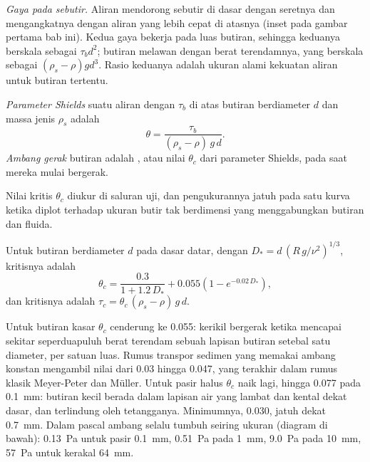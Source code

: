 \emph{Gaya pada sebutir.} Aliran mendorong sebutir di dasar dengan seretnya dan mengangkatnya dengan aliran yang lebih cepat di atasnya (inset pada gambar pertama bab
ini). Kedua gaya bekerja pada luas butiran, sehingga keduanya berskala sebagai $\tau_b
d^2$; butiran melawan dengan berat terendamnya, yang berskala sebagai
$(\rho_s - \rho) g d^3$. Rasio keduanya adalah ukuran alami kekuatan aliran untuk butiran tertentu.

\begin{definition}\label{def:b1:erosion-transport:threshold}
\emph{Parameter Shields} suatu aliran dengan  $\tau_b$ di atas butiran berdiameter $d$ dan massa jenis $\rho_s$ adalah
\[
  \theta = \frac{\tau_b}{(\rho_s - \rho)\,g\,d}.
\]
\emph{Ambang gerak} butiran adalah , atau nilai $\theta_c$ dari parameter Shields, pada saat mereka mulai bergerak.
\end{definition}

Nilai kritis $\theta_c$ diukur di saluran uji, dan pengukurannya jatuh pada satu kurva ketika diplot terhadap ukuran butir tak berdimensi yang menggabungkan butiran dan fluida.

\begin{proposition}\label{prop:b1:erosion-transport:soulsby}
Untuk butiran berdiameter $d$ pada dasar datar, dengan
$D_* = d\,\left(R\,g/\nu^2\right)^{1/3}$,  kritisnya adalah
\[
  \theta_c = \frac{0.3}{1 + 1.2\,D_*} + 0.055\left(1 - e^{-0.02\,D_*}\right),
\]
dan  kritisnya adalah $\tau_c = \theta_c\,(\rho_s - \rho)\,g\,d$.
\end{proposition}
\admitted

Untuk butiran kasar $\theta_c$ cenderung ke \num{0.055}: kerikil bergerak ketika  mencapai sekitar seperduapuluh berat terendam sebuah lapisan butiran setebal satu diameter, per satuan luas. Rumus transpor sedimen yang memakai ambang konstan mengambil nilai dari \num{0.03} hingga \num{0.047}, yang terakhir dalam rumus  klasik Meyer-Peter dan Müller. Untuk pasir halus $\theta_c$ naik lagi, hingga
\num{0.077} pada \qty{0.1}{mm}: butiran kecil berada dalam lapisan air yang lambat dan kental dekat dasar, dan terlindung oleh tetangganya. Minimumnya,
\num{0.030}, jatuh dekat \qty{0.7}{mm}. Dalam pascal ambang selalu tumbuh seiring ukuran (diagram di bawah): \qty{0.13}{Pa} untuk pasir \qty{0.1}{mm},
\qty{0.51}{Pa} pada \qty{1}{mm}, \qty{9.0}{Pa} pada \qty{10}{mm}, \qty{57}{Pa} untuk kerakal \qty{64}{mm}.

